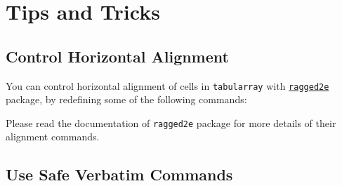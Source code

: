 \documentclass[oneside]{book}
\begin{document}
\chapter{Tips and Tricks}

\section{Control Horizontal Alignment}

You can control horizontal alignment of cells in \texttt{tabularray} with
\href{https://www.ctan.org/pkg/ragged2e}{\texttt{ragged2e}} package,
by redefining some of the following commands:

\begin{codehigh}
\RenewDocumentCommand\TblrAlignBoth{}{\justifying}
\RenewDocumentCommand\TblrAlignLeft{}{\RaggedRight}
\RenewDocumentCommand\TblrAlignCenter{}{\Centering}
\RenewDocumentCommand\TblrAlignRight{}{\RaggedLeft}
\end{codehigh}

Please read the documentation of \texttt{ragged2e} package for more details of
their alignment commands.

\section{Use Safe Verbatim Commands}%
\label{sec:fakeverb}
\end{document}
